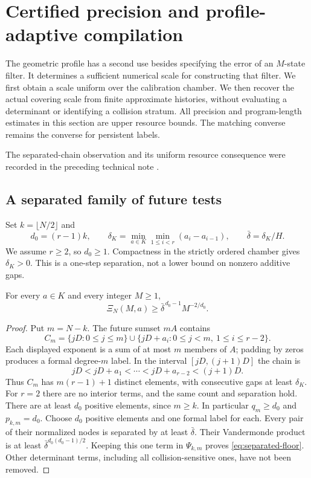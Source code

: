 \section{Certified precision and profile-adaptive compilation}
\label{sec:certified-resources}
The geometric profile has a second use besides specifying the error of
an $M$-state filter. It determines a sufficient numerical scale for
constructing that filter. We first obtain a scale uniform over the
calibration chamber. We then recover the actual covering scale from
finite approximate histories, without evaluating a determinant or
identifying a collision stratum. All precision and program-length
estimates in this section are upper resource bounds. The matching
converse remains the converse for persistent labels.

The separated-chain observation and its uniform resource consequence
were recorded in the preceding technical note \cite{A1v10note}.

\subsection{A separated family of future tests}
Set $k=\lfloor N/2\rfloor$ and
\[
 d_0=(r-1)k,\qquad
 \delta_K=\min_{a\in K}\min_{1\le i<r}(a_i-a_{i-1}),\qquad
 \bar\delta=\delta_K/H.
\]
We assume $r\ge2$, so $d_0\ge1$. Compactness in the strictly ordered
chamber gives $\delta_K>0$. This is a one-step separation, not a lower
bound on nonzero additive gaps.

\begin{proposition}\label{prop:separated-floor}
For every $a\in K$ and every integer $M\ge1$,
\begin{equation}\label{eq:separated-floor}
 \Xi_N(M,a)\ge \bar\delta^{\,d_0-1}M^{-2/d_0}.
\end{equation}
\end{proposition}
\begin{proof}
Put $m=N-k$. The future sumset $mA$ contains
\[
 C_m=\{jD:0\le j\le m\}
       \cup\{jD+a_i:0\le j<m,\ 1\le i\le r-2\}.
\]
Each displayed exponent is a sum of at most $m$ members of $A$;
padding by zeros produces a formal degree-$m$ label. In the interval
$[jD,(j+1)D]$ the chain is
\[
 jD<jD+a_1<\cdots<jD+a_{r-2}<(j+1)D.
\]
Thus $C_m$ has $m(r-1)+1$ distinct elements, with consecutive gaps at
least $\delta_K$. For $r=2$ there are no interior terms, and the same
count and separation hold. There are at least $d_0$ positive elements,
since $m\ge k$. In particular $q_m\ge d_0$ and
$p_{k,m}=d_0$.
Choose $d_0$ positive elements and one formal label for each. Every
pair of their normalized nodes is separated by at least $\bar\delta$.
Their Vandermonde product is at least
$\bar\delta^{d_0(d_0-1)/2}$. Keeping this one term in
$\Psi_{k,m}$ proves \eqref{eq:separated-floor}. Other determinant
terms, including all collision-sensitive ones, have not been removed.
\end{proof}

